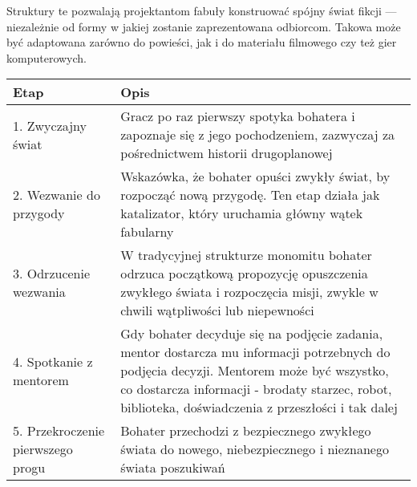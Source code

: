 Struktury te pozwalają projektantom fabuły konstruować spójny świat fikcji --- niezależnie od formy w
jakiej zostanie zaprezentowana odbiorcom. Takowa może być adaptowana zarówno do powieści, jak i do materiału
filmowego czy też gier komputerowych.

\begin{table}[h!]
	\begin{center}
		\begin{tabular}{p{1.5in} p{4in}}
			\hline
			Etap                                & Opis                                                                                                                                                                                                                                                                                                                            \\
			\hline
			1. Zwyczajny świat                  & Gracz po raz pierwszy spotyka bohatera i zapoznaje się z jego pochodzeniem, zazwyczaj za pośrednictwem historii drugoplanowej                                                                                                                                                                                                   \\
			2. Wezwanie do przygody             & Wskazówka, że bohater opuści zwykły świat, by rozpocząć nową przygodę. Ten etap działa jak katalizator, który uruchamia główny wątek fabularny                                                                                                                                                                                  \\
			3. Odrzucenie wezwania              & W tradycyjnej strukturze monomitu bohater odrzuca początkową propozycję opuszczenia zwykłego świata i rozpoczęcia misji, zwykle w chwili wątpliwości lub niepewności                                                                                                                                                            \\
			4. Spotkanie z mentorem             & Gdy bohater decyduje się na podjęcie zadania, mentor dostarcza mu informacji potrzebnych do podjęcia decyzji. Mentorem może być wszystko, co dostarcza informacji - brodaty starzec, robot, biblioteka, doświadczenia z przeszłości i tak dalej                                                                                 \\
			5. Przekroczenie pierwszego progu   & Bohater przechodzi z bezpiecznego zwykłego świata do nowego, niebezpiecznego i nieznanego świata poszukiwań                                                                                                                                                                                                                     \\

\end{tabular}
\end{center}
\end{table}
